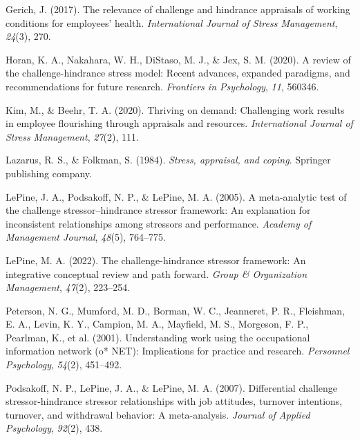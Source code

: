 \documentclass[
  man]{apa6}
\newlength{\cslhangindent}
\newlength{\cslentryspacingunit} %
\newenvironment{CSLReferences}[2] %
 {%
  \setlength{\parindent}{0pt}
  \ifodd #1
  \let\oldpar\par
  \def\par{\hangindent=\cslhangindent\oldpar}
  \fi
  \setlength{\parskip}{#2\cslentryspacingunit}
 }%
 {}
\begin{document}
\begin{CSLReferences}{1}{0}
\leavevmode{}%
Gerich, J. (2017). The relevance of challenge and hindrance appraisals of working conditions for employees' health. \emph{International Journal of Stress Management}, \emph{24}(3), 270.

\leavevmode{}%
Horan, K. A., Nakahara, W. H., DiStaso, M. J., \& Jex, S. M. (2020). A review of the challenge-hindrance stress model: Recent advances, expanded paradigms, and recommendations for future research. \emph{Frontiers in Psychology}, \emph{11}, 560346.

\leavevmode{}%
Kim, M., \& Beehr, T. A. (2020). Thriving on demand: Challenging work results in employee flourishing through appraisals and resources. \emph{International Journal of Stress Management}, \emph{27}(2), 111.

\leavevmode{}%
Lazarus, R. S., \& Folkman, S. (1984). \emph{Stress, appraisal, and coping}. Springer publishing company.

\leavevmode{}%
LePine, J. A., Podsakoff, N. P., \& LePine, M. A. (2005). A meta-analytic test of the challenge stressor--hindrance stressor framework: An explanation for inconsistent relationships among stressors and performance. \emph{Academy of Management Journal}, \emph{48}(5), 764--775.

\leavevmode{}%
LePine, M. A. (2022). The challenge-hindrance stressor framework: An integrative conceptual review and path forward. \emph{Group \& Organization Management}, \emph{47}(2), 223--254.

\leavevmode{}%
Peterson, N. G., Mumford, M. D., Borman, W. C., Jeanneret, P. R., Fleishman, E. A., Levin, K. Y., Campion, M. A., Mayfield, M. S., Morgeson, F. P., Pearlman, K., et al. (2001). Understanding work using the occupational information network (o* NET): Implications for practice and research. \emph{Personnel Psychology}, \emph{54}(2), 451--492.

\leavevmode{}%
Podsakoff, N. P., LePine, J. A., \& LePine, M. A. (2007). Differential challenge stressor-hindrance stressor relationships with job attitudes, turnover intentions, turnover, and withdrawal behavior: A meta-analysis. \emph{Journal of Applied Psychology}, \emph{92}(2), 438.


\end{CSLReferences}
\end{document}
